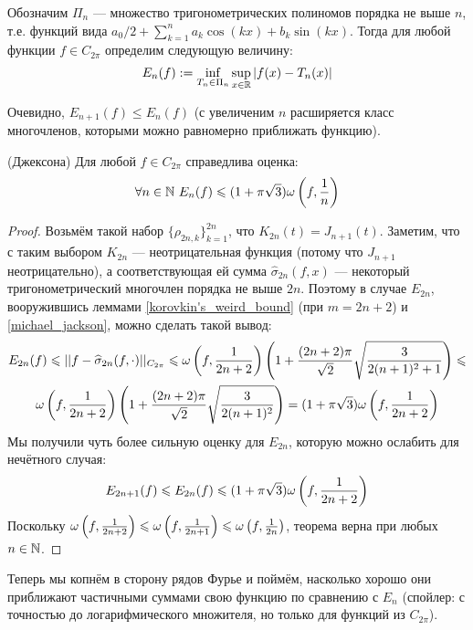 \begin{definition}
	Обозначим $\Pi_n$ --- множество тригонометрических полиномов порядка не выше $n$, т.е. функций вида $a_0/2 + \sum_{k=1}^n a_k\cos(kx) + b_k\sin(kx)$. Тогда для любой функции $f \in C_{2\pi}$ определим следующую величину:
	\[
		E_n(f) := \inf_{T_n \in \Pi_n} \sup_{x \in \mathbb{R}} |f(x) - T_n(x)|
	\]
\end{definition}

\begin{note}
	Очевидно, $E_{n+1}(f) \leq E_n(f)$ (с увеличеним $n$ расширяется класс многочленов, которыми можно равномерно приближать функцию).
\end{note}

\begin{theorem} (Джексона) \label{E_n_bound}
	Для любой $f \in C_{2\pi}$ справедлива оценка:
	\[
		\forall n \in \N \ E_n(f) \leq (1 + \pi\sqrt{3}) \omega\ps{f, \frac{1}{n}}
	\]
\end{theorem}

\begin{proof}
	Возьмём такой набор $\{\rho_{2n, k}\}_{k=1}^{2n}$, что $K_{2n}(t) = J_{n+1}(t)$. Заметим, что с таким выбором $K_{2n}$ --- неотрицательная функция (потому что $J_{n+1}$ неотрицательно), а соответствующая ей сумма $\widehat\sigma_{2n}(f, x)$ --- некоторый тригонометрический многочлен порядка не выше $2n$. Поэтому в случае $E_{2n}$, вооружившись леммами \ref{korovkin's_weird_bound} (при $m = 2n+2$) и \ref{michael_jackson},  можно сделать такой вывод:
	\begin{multline*}
		E_{2n}(f) \leqslant ||f - \widehat\sigma_{2n}(f, \cdot)||_{C_{2\pi}} \leqslant \omega \left(f, \frac{1}{2n+2}\right)\left(1 + \frac{(2n+2)\pi}{\sqrt{2}}\sqrt{\frac{3}{2(n+1)^2 + 1}}\right) \leqslant \\ \omega \left(f, \frac{1}{2n+2}\right)\left(1 + \frac{(2n+2)\pi}{\sqrt{2}}\sqrt{\frac{3}{2(n+1)^2}}\right) = (1 + \pi\sqrt{3}) \omega\left(f, \frac{1}{2n+2}\right)
	\end{multline*}
	Мы получили чуть более сильную оценку для $E_{2n}$, которую можно ослабить для нечётного случая:
	\[
		E_{2n+1}(f) \leqslant E_{2n}(f) \leqslant (1 + \pi\sqrt{3}) \omega\left(f, \frac{1}{2n+2}\right)
	\]
	Поскольку $\omega\left(f, \frac{1}{2n+2}\right) \leqslant \omega\left(f, \frac{1}{2n+1}\right) \leqslant \omega\left(f, \frac{1}{2n}\right)$, теорема верна при любых $n \in \mathbb{N}$.
\end{proof}

\begin{note}
	Теперь мы копнём в сторону рядов Фурье и поймём, насколько хорошо они приближают частичными суммами свою функцию по сравнению с $E_n$ (спойлер: с точностью до логарифмического множителя, но только для функций из $C_{2\pi}$).
\end{note}

